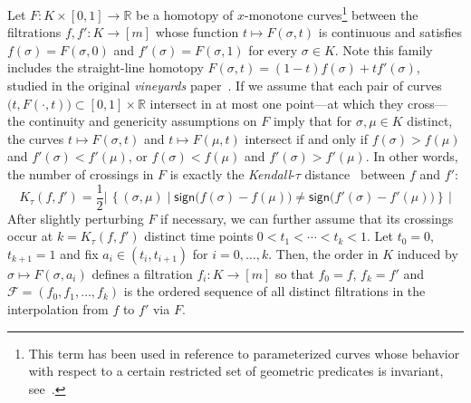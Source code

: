 \documentclass[sn-mathphys]{sn-jnl}
\begin{document}
Let $F : K \times [0,1] \to \mathbb{R}$ be a homotopy of $x$-monotone curves\footnote{This term has been used in reference to parameterized curves whose behavior with respect to a certain restricted set of geometric predicates is invariant, see~\cite{boissonnat2000efficient}. } between the  filtrations 
$f,f' : K \rightarrow [m]$ whose function $t\mapsto F(\sigma, t)$ is continuous and satisfies $f(\sigma) = F(\sigma, 0)$ and $f'(\sigma) = F(\sigma, 1)$ for every  $\sigma \in K$.
Note this family includes the straight-line homotopy $F(\sigma, t) = (1 - t) f(\sigma) + t f'(\sigma)$,  studied in the original \emph{vineyards} paper~\cite{cohen2006vines}. 
If we assume that each pair of curves $\big(t,  F(\cdot, t)\big) \subset [0,1]\times \mathbb{R}$  intersect in at most one point---at which they cross---the continuity and genericity assumptions on $F$ imply that for $ \sigma,\mu \in K$ distinct,  the curves   $t \mapsto F(\sigma ,t)$ and $t \mapsto F(\mu,t)$ intersect if and only if $f(\sigma) > f(\mu)$ and $f'(\sigma)  < f'(\mu)$, or $f(\sigma) < f(\mu)$ and $f'(\sigma)  > f'(\mu)$. 
 In other words, the number of crossings in $F$ is 
 exactly the  \emph{Kendall}-$\tau$ distance~\cite{diaconis1977spearman} between $f$ and $f'$: 
\begin{equation}\label{eq:kendall_dist}
	K_\tau(f, f') = 
 \frac{1}{2} \left\lvert \, \left\{(\sigma, \mu) \mid \mathsf{sign}\big(f(\sigma) - f(\mu) \big) \neq \mathsf{sign}\big(f'(\sigma) - f'(\mu)\big) \right\} \, \right\rvert
\end{equation}
After slightly perturbing $F$ if necessary,  we can further assume that its crossings occur at  $k = K_\tau(f,f')$ distinct time points $0< t_1 < \cdots < t_k < 1$. 
Let $t_0 = 0$, $t_{k+1}= 1$ and fix 
$a_i \in (t_{i}, t_{i + 1})$ for $i=0, \ldots, k$. 
Then, the order in $K$ induced by $\sigma \mapsto F(\sigma, a_i)$
defines a filtration $f_i : K \rightarrow [m]$
so  that $f_0 = f$, $f_k = f'$ and 
$\mathcal{F} = (f_0, f_1,\ldots, f_k)$ is the ordered sequence of all distinct filtrations in the interpolation from $f$ to $f'$ via $F$.
\end{document}
